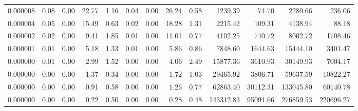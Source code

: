 \begin{tabular}{lrrrrrrrrrrrr}
0.000008 & 0.08 & 0.00 & 22.77 & 1.16 & 0.04 & 0.00 & 26.24 & 0.58 & 1239.39 & 74.70 & 2280.66 & 236.06 \\
0.000004 & 0.05 & 0.00 & 15.49 & 0.63 & 0.02 & 0.00 & 18.28 & 1.31 & 2215.42 & 109.31 & 4138.94 & 88.18 \\
0.000002 & 0.02 & 0.00 & 9.41 & 1.85 & 0.01 & 0.00 & 11.01 & 0.77 & 4102.25 & 740.72 & 8002.72 & 1708.46 \\
0.000001 & 0.01 & 0.00 & 5.18 & 1.33 & 0.01 & 0.00 & 5.86 & 0.86 & 7848.60 & 1644.63 & 15444.10 & 3401.47 \\
0.000000 & 0.01 & 0.00 & 2.99 & 1.52 & 0.00 & 0.00 & 4.06 & 2.49 & 15877.36 & 3610.93 & 30149.93 & 7004.17 \\
0.000000 & 0.00 & 0.00 & 1.37 & 0.34 & 0.00 & 0.00 & 1.72 & 1.03 & 29465.92 & 3806.71 & 59637.59 & 10822.27 \\
0.000000 & 0.00 & 0.00 & 0.91 & 0.58 & 0.00 & 0.00 & 1.26 & 0.77 & 62863.40 & 30112.31 & 133045.80 & 60140.78 \\
0.000000 & 0.00 & 0.00 & 0.22 & 0.50 & 0.00 & 0.00 & 0.28 & 0.48 & 143312.83 & 95091.66 & 276859.53 & 220696.27 \\
\bottomrule
\end{tabular}
